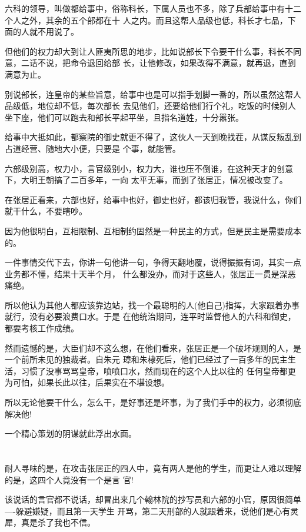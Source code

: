 \documentclass[11pt,a4paper,onecolumn]{article}
\begin{document}
六科的领导，叫做都给事中，俗称科长，下属人员也不多，除了兵部给事中有十二个人之外，其余的五个部都在十
人之内。而且这帮人品级也低，科长才七品，下面的人就不用说了。

但他们的权力却大到让人匪夷所思的地步，比如说部长下令要干什么事，科长不同意，二话不说，把命令退回给部
长，让他修改，如果改得不满意，就再退，直到满意为止。

别说部长，连皇帝的某些旨意，给事中也是可以指手划脚一番的，所以虽然这帮人品级低，地位却不低，每次部长
去见他们，还要给他们行个礼，吃饭的时候别人坐下座，他们可以跑去和部长平起平坐，且指名道姓，十分嚣张。

给事中大抵如此，都察院的御史就更不得了，这伙人一天到晚找茬，从谋反叛乱到占道经营、随地大小便，只要是
个事，就能管。

六部级别高，权力小，言官级别小，权力大，谁也压不倒谁，在这种天才的创意下，大明王朝搞了二百多年，一向
太平无事，而到了张居正，情况被改变了。

在张居正看来，六部也好，给事中也好，御史也好，都该归我管，我说什么，你们就干什么，不要瞎吵。

因为他很明白，互相限制、互相制约固然是一种民主的方式，但是民主是需要成本的。

一件事情交代下去，你讲一句他讲一句，争得天翻地覆，说得振振有词，其实一点业务都不懂，结果十天半个月，
什么都没办，而对于这些人，张居正一贯是深恶痛绝。

所以他认为其他人都应该靠边站，找一个最聪明的人(他自己)指挥，大家跟着办事就行，没有必要浪费口水。于是
在他统治期间，连平时监督他人的六科和御史，都要考核工作成绩。

然而遗憾的是，大臣们却不这么想，在他们看来，张居正是一个破坏规则的人，是一个前所未见的独裁者。自朱元
璋和朱棣死后，他们已经过了一百多年的民主生活，习惯了没事骂骂皇帝，喷喷口水，然而现在的这个人比以往的
任何皇帝都更为可怕，如果长此以往，后果实在不堪设想。

所以无论他要干什么，怎么干，是好事还是坏事，为了我们手中的权力，必须彻底解决他!

一个精心策划的阴谋就此浮出水面。

\section[\thesection]{}

耐人寻味的是，在攻击张居正的四人中，竟有两人是他的学生，而更让人难以理解的是，这四个人竟没有一个是言
官!

该说话的言官都不说话，却冒出来几个翰林院的抄写员和六部的小官，原因很简单----躲避嫌疑，而且第一天学生
开骂，第二天刑部的人就跟着来，说他们是心有灵犀，真是杀了我也不信。
\end{document}
